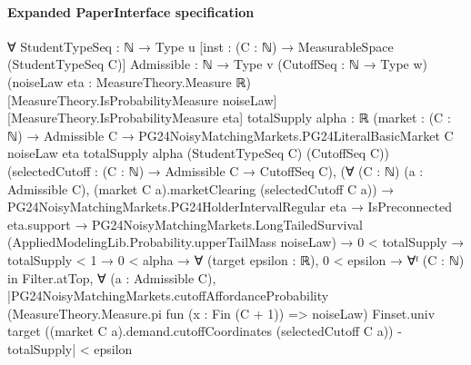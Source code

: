 \documentclass[10pt]{article}
\begin{document}
\paragraph{Expanded PaperInterface specification}
\begin{ReviewVerbatim}
∀ {StudentTypeSeq : ℕ → Type u} [inst : (C : ℕ) → MeasurableSpace (StudentTypeSeq C)] {Admissible : ℕ → Type v}
  (CutoffSeq : ℕ → Type w) (noiseLaw eta : MeasureTheory.Measure ℝ) [MeasureTheory.IsProbabilityMeasure noiseLaw]
  [MeasureTheory.IsProbabilityMeasure eta] {totalSupply alpha : ℝ}
  (market :
    (C : ℕ) →
      Admissible C →
        PG24NoisyMatchingMarkets.PG24LiteralBasicMarket C noiseLaw eta totalSupply alpha (StudentTypeSeq C)
          (CutoffSeq C))
  (selectedCutoff : (C : ℕ) → Admissible C → CutoffSeq C),
  (∀ (C : ℕ) (a : Admissible C), (market C a).marketClearing (selectedCutoff C a)) →
    PG24NoisyMatchingMarkets.PG24HolderIntervalRegular eta →
      IsPreconnected eta.support →
        PG24NoisyMatchingMarkets.LongTailedSurvival (AppliedModelingLib.Probability.upperTailMass noiseLaw) →
          0 < totalSupply →
            totalSupply < 1 →
              0 < alpha →
                ∀ (target epsilon : ℝ),
                  0 < epsilon →
                    ∀ᶠ (C : ℕ) in Filter.atTop,
                      ∀ (a : Admissible C),
                        |PG24NoisyMatchingMarkets.cutoffAffordanceProbability
                                (MeasureTheory.Measure.pi fun (x : Fin (C + 1)) => noiseLaw) Finset.univ target
                                ((market C a).demand.cutoffCoordinates (selectedCutoff C a)) -
                              totalSupply| <
                          epsilon
\end{ReviewVerbatim}
\end{document}
